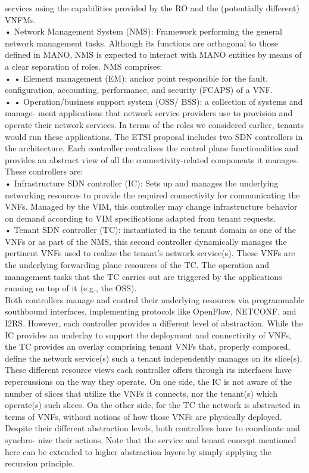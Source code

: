 \documentclass{article}
\begin{document}
services using the capabilities provided by the
RO and the (potentially different) VNFMs.\\
• Network Management System (NMS): Framework performing the general network management tasks. Although its functions are orthogonal
to those defined in MANO, NMS is expected to
interact with MANO entities by means of a clear
separation of roles. NMS comprises:\\
• • Element management (EM): anchor point
responsible for the fault, configuration,
accounting, performance, and security
(FCAPS) of a VNF.\\
• • Operation/business support system (OSS/
BSS): a collection of systems and manage-
ment applications that network service providers use to provision and operate their network
services. In terms of the roles we considered
earlier, tenants would run these applications.
The ETSI proposal includes two SDN controllers
in the architecture. Each controller centralizes
the control plane functionalities and provides an
abstract view of all the connectivity-related components it manages. These controllers are:\\
• Infrastructure SDN controller (IC): Sets up
and manages the underlying networking resources to provide the required connectivity for communicating the VNFs.
Managed by the VIM, this controller may change
infrastructure behavior on demand according to
VIM specifications adapted from tenant requests.\\
• Tenant SDN controller (TC): instantiated in
the tenant domain as one of the VNFs or as
part of the NMS, this second controller dynamically manages the pertinent VNFs used to realize
the tenant’s network service(s). These VNFs are
the underlying forwarding plane resources of the
TC. The operation and management tasks that the
TC carries out are triggered by the applications
running on top of it (e.g., the OSS).\\
Both controllers manage and control their
underlying resources via programmable southbound interfaces, implementing protocols like
OpenFlow, NETCONF, and I2RS. However, each
controller provides a different level of abstraction. While the IC provides an underlay to support
the deployment and connectivity of VNFs, the
TC provides an overlay comprising tenant VNFs
that, properly composed, define the network service(s) such a tenant independently manages on
its slice(s). These different resource views each
controller offers through its interfaces have repercussions on the way they operate. On one side,
the IC is not aware of the number of slices that utilize the VNFs it connects, nor the tenant(s) which
operate(s) such slices. On the other side, for the
TC the network is abstracted in terms of VNFs,
without notions of how those VNFs are physically
deployed. Despite their different abstraction levels,
both controllers have to coordinate and synchro-
nize their actions. Note that the service and
tenant concept mentioned here can be extended
to higher abstraction layers by simply applying the
recursion principle.
\end{document}
